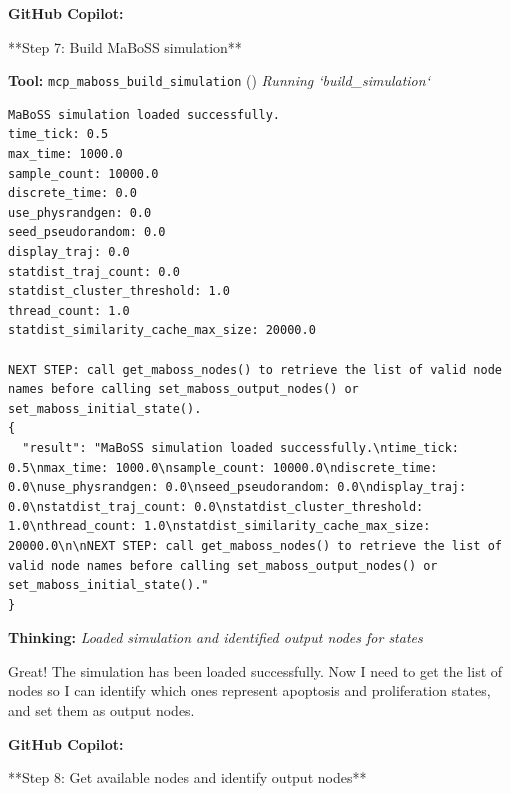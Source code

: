 \documentclass[11pt,a4paper]{article}
\begin{document}
\begin{copilotbox}
\textbf{GitHub Copilot:}

**Step 7: Build MaBoSS simulation**

\end{copilotbox}
\begin{toolokbox}
\textbf{Tool:} \texttt{mcp\_maboss\_build\_simulation} (\checkmark)
\textit{Running `build\_simulation`}
\begin{lstlisting}
MaBoSS simulation loaded successfully.
time_tick: 0.5
max_time: 1000.0
sample_count: 10000.0
discrete_time: 0.0
use_physrandgen: 0.0
seed_pseudorandom: 0.0
display_traj: 0.0
statdist_traj_count: 0.0
statdist_cluster_threshold: 1.0
thread_count: 1.0
statdist_similarity_cache_max_size: 20000.0

NEXT STEP: call get_maboss_nodes() to retrieve the list of valid node names before calling set_maboss_output_nodes() or set_maboss_initial_state().
{
  "result": "MaBoSS simulation loaded successfully.\ntime_tick: 0.5\nmax_time: 1000.0\nsample_count: 10000.0\ndiscrete_time: 0.0\nuse_physrandgen: 0.0\nseed_pseudorandom: 0.0\ndisplay_traj: 0.0\nstatdist_traj_count: 0.0\nstatdist_cluster_threshold: 1.0\nthread_count: 1.0\nstatdist_similarity_cache_max_size: 20000.0\n\nNEXT STEP: call get_maboss_nodes() to retrieve the list of valid node names before calling set_maboss_output_nodes() or set_maboss_initial_state()."
}
\end{lstlisting}
\end{toolokbox}
\begin{thinkbox}
\textbf{Thinking:} \textit{Loaded simulation and identified output nodes for states}

Great! The simulation has been loaded successfully. Now I need to get the list of nodes so I can identify which ones represent apoptosis and proliferation states, and set them as output nodes.

\end{thinkbox}
\begin{copilotbox}
\textbf{GitHub Copilot:}

**Step 8: Get available nodes and identify output nodes**

\end{copilotbox}
\end{document}
